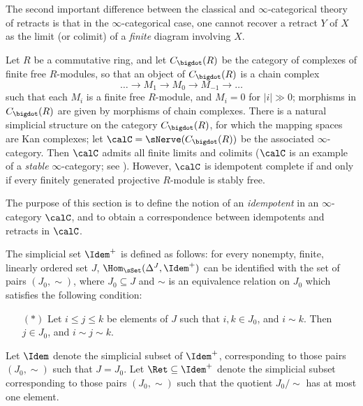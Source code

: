 The second important difference between the classical and $\infty$-categorical theory of retracts is that in the $\infty$-categorical case, one cannot recover a retract $Y$ of $X$ as the limit (or colimit) of a {\em finite} diagram involving $X$.

\begin{example}
Let $R$ be a commutative ring, and let $C_{\bigdot}(R)$ be the category of complexes of finite free $R$-modules, so that an object of $C_{\bigdot}(R)$ is a chain complex
$$ \ldots \rightarrow M_{1} \rightarrow M_0 \rightarrow M_{-1} \rightarrow \ldots $$
such that each $M_{i}$ is a finite free $R$-module, and $M_{i} = 0$ for $|i| \gg 0$; morphisms in $C_{\bigdot}(R)$ are given by morphisms of chain complexes. There is a natural simplicial structure on the category $C_{\bigdot}(R)$, for which the mapping spaces are Kan complexes; let $\calC = \sNerve( C_{\bigdot}(R) )$ be the associated $\infty$-category. Then $\calC$ admits all finite limits and colimits ($\calC$ is an example of a {\em stable} $\infty$-category; see \cite{DAG}). However, $\calC$ is idempotent complete if and only if every finitely generated projective $R$-module is stably free.
\end{example}

The purpose of this section is to define the notion of an {\it idempotent} in an $\infty$-category $\calC$, and to obtain a correspondence between idempotents and retracts in $\calC$.

\begin{definition}
The simplicial set $\Idem^{+}$ is defined as follows: 
for every nonempty, finite, linearly ordered set $J$, $\Hom_{\sSet}(\Delta^{J}, \Idem^{+})$ can be identified with the set of pairs $(J_0, \sim)$, where $J_0 \subseteq J$
and $\sim$ is an equivalence relation on $J_0$ which satisfies the following condition:
\begin{itemize}
\item[$(\ast)$] Let $i \leq j \leq k$ be elements of $J$ such that $i,k \in J_0$, and
$i \sim k$. Then $j \in J_0$, and $i \sim j \sim k$.
\end{itemize}

Let $\Idem$ denote the simplicial subset of $\Idem^{+}$, corresponding to those pairs
$(J_0, \sim)$ such that $J=J_0$. Let $\Ret \subseteq \Idem^{+}$ denote the simplicial subset corresponding to those pairs $(J_0, \sim)$ such that the quotient $J_0 / \sim$ has at most one element.
\end{definition}

